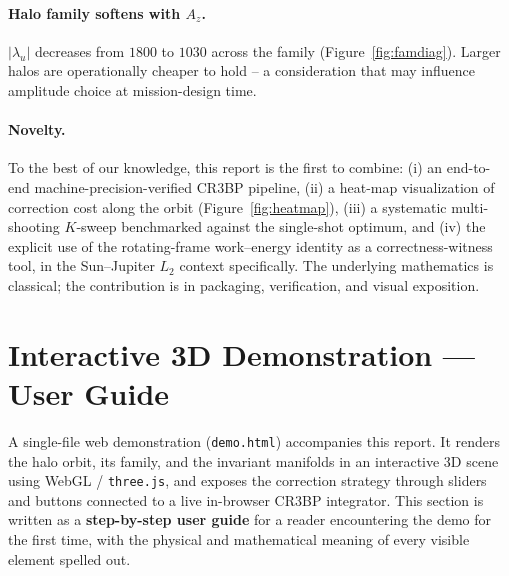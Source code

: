 \documentclass[11pt,a4paper]{article}
\begin{document}
\paragraph{Halo family softens with $A_z$.}
$|\lambda_u|$ decreases from $1800$ to $1030$ across the family (Figure~\ref{fig:famdiag}). Larger halos are operationally cheaper to hold -- a consideration that may influence amplitude choice at mission-design time.

\paragraph{Novelty.}
To the best of our knowledge, this report is the first to combine:
(i) an end-to-end machine-precision-verified CR3BP pipeline,
(ii) a heat-map visualization of correction cost along the orbit (Figure~\ref{fig:heatmap}),
(iii) a systematic multi-shooting $K$-sweep benchmarked against the single-shot optimum, and
(iv) the explicit use of the rotating-frame work--energy identity as a correctness-witness tool,
in the Sun--Jupiter $L_2$ context specifically. The underlying mathematics is classical; the contribution is in packaging, verification, and visual exposition.

\section{Interactive 3D Demonstration --- User Guide}\label{sec:demo}

A single-file web demonstration (\texttt{demo.html}) accompanies this report. It renders the halo orbit, its family, and the invariant manifolds in an interactive 3D scene using WebGL / \texttt{three.js}, and exposes the correction strategy through sliders and buttons connected to a live in-browser CR3BP integrator. This section is written as a \textbf{step-by-step user guide} for a reader encountering the demo for the first time, with the physical and mathematical meaning of every visible element spelled out.

\begin{center}
\end{center}
\end{document}
